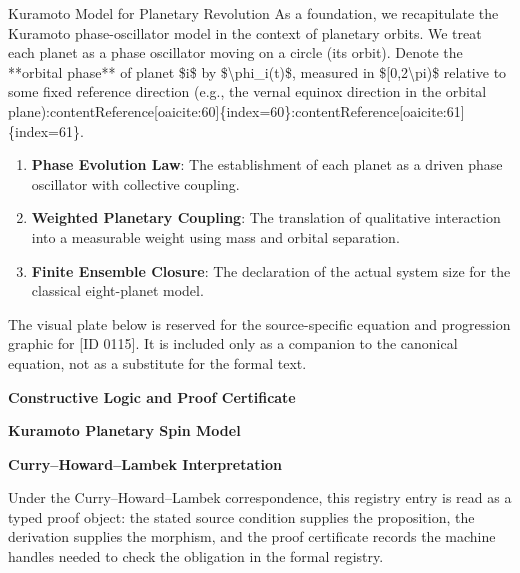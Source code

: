 Kuramoto Model for Planetary Revolution As a foundation, we recapitulate the Kuramoto phase-oscillator model in the context of planetary orbits. We treat each planet as a phase oscillator moving on a circle (its orbit). Denote the **orbital phase** of planet \$i\$ by \$\textbackslash{}phi\_i(t)\$, measured in \$[0,2\textbackslash{}pi)\$ relative to some fixed reference direction (e.g., the vernal equinox direction in the orbital plane):contentReference[oaicite:60]\{index=60\}:contentReference[oaicite:61] \{index=61\}.
\endgroup

\begin{enumerate}[leftmargin=1.6em,itemsep=6pt,topsep=4pt]
\item \textbf{Phase Evolution Law}: The establishment of each planet as a driven phase oscillator with collective coupling.
\item \textbf{Weighted Planetary Coupling}: The translation of qualitative interaction into a measurable weight using mass and orbital separation.
\item \textbf{Finite Ensemble Closure}: The declaration of the actual system size for the classical eight-planet model.
\end{enumerate}

\begingroup\footnotesize\sloppy
The visual plate below is reserved for the source-specific equation and progression graphic for [ID 0115]. It is included only as a companion to the canonical equation, not as a substitute for the formal text.
\par\endgroup
\ifTZPDarkEdition
{}
\fi

\clearpage
\begingroup\tzpsupportsetup
\noindent\textbf{\fontsize{10.8pt}{12.8pt}\selectfont [ID 0115] Constructive Logic and Proof Certificate}\par
\noindent\textbf{\fontsize{10pt}{12pt}\selectfont Kuramoto Planetary Spin Model}\par
\vspace{0.45em}
\begingroup
\footnotesize
\setlength{\parskip}{0.22em}
\setlength{\parindent}{0pt}
\noindent\textbf{Curry--Howard--Lambek Interpretation}\par
Under the Curry--Howard--Lambek correspondence, this registry entry is read as a typed proof
object: the stated source condition supplies the proposition, the derivation supplies the
morphism, and the proof certificate records the machine handles needed to check the obligation
in the formal registry.

